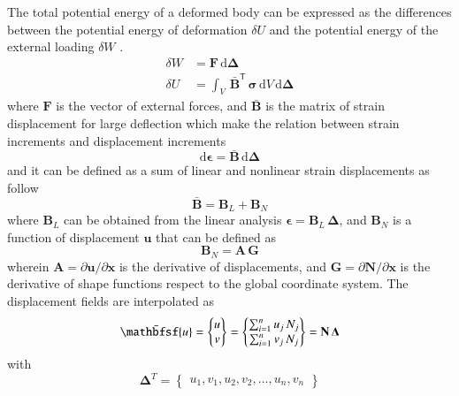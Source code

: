 The total potential energy of a deformed body can be expressed as the differences between the potential energy of deformation $\delta{U}$ and the potential energy of the external loading $\delta{W}$ \cite{Yangetal10}. 
\begin{subequations}
\begin{align}
\delta{W} & = \mathbf{F} \, \mathrm{d} \boldsymbol{\Delta}\\
\delta{U} & = \int_{V} \, \bar{\mathbf{B}}^{\mathsf{T}} \, \boldsymbol{\sigma} \, \mathrm{d} V \, \mathrm{d} \boldsymbol{\Delta}
\end{align}
\end{subequations}
where $\mathbf{F}$ is the vector of external forces, and $\bar{\mathbf{B}}$ is the matrix of strain displacement for large deflection which make the relation between strain increments and displacement increments 
\begin{equation}
\mathrm{d} \boldsymbol{\epsilon} = \bar{\mathbf{B}} \, \mathrm{d} \boldsymbol{\Delta}
\end{equation}
and it can be defined as a sum of linear and nonlinear strain displacements as follow
\begin{equation}
\bar{\mathbf{B}} = \mathbf{B}_L + \mathbf{B}_N
\label{straindis}
\end{equation} 
where $\mathbf{B}_L$ can be obtained from the linear analysis $\boldsymbol{\epsilon} = \mathbf{B}_L \, \boldsymbol{\Delta}$, and $\mathbf{B}_N$ is a function of displacement $ \mathbf{u}$ that can be defined as 
\begin{equation}
\mathbf{B}_N = \mathbf{A} \, \mathbf{G}
\end{equation} 
wherein $\mathbf{A}= \partial \mathbf{u} / \partial \mathbf{x}$ is the derivative of displacements, and $\mathbf{G}= \partial \mathbf{N} / \partial \mathbf{x}$ is the derivative of shape functions respect to the global coordinate system. The displacement fields are interpolated as
\begin{equation}
\bar{\mathbfsf{ u}} = 
\begin{Bmatrix}
u \\
v     
\end{Bmatrix}
=
\begin{Bmatrix}
\sum_{i=1}^{n} u_j \, N_j \\
\sum_{i=1}^{n} v_j \, N_j     
\end{Bmatrix}
= \mathbf{N} \, \mathbf{\Delta}
\end{equation}
with
\begin{equation}
\mathbf{\Delta}^T  = 
\begin{Bmatrix}
u_1 , v_1, u_2 , v_2, ..., u_n , v_n
\end{Bmatrix}
\end{equation}

